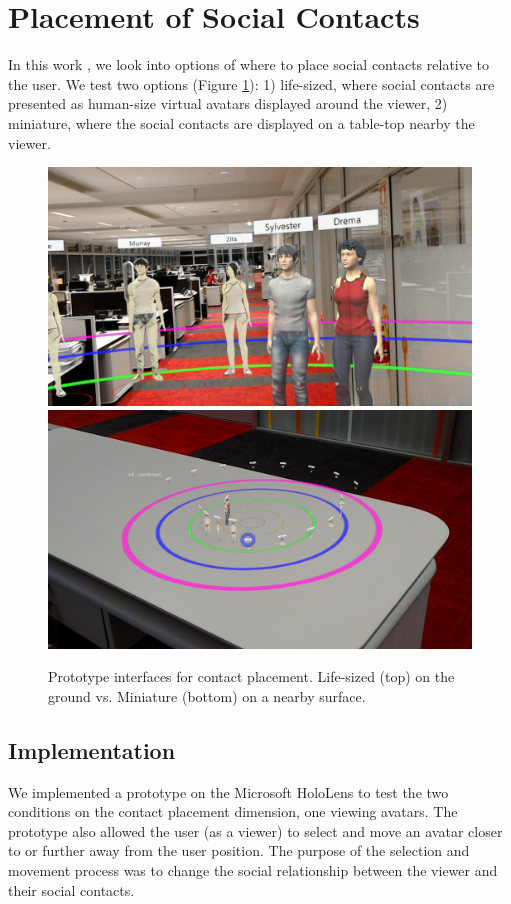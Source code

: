\section{Placement of Social Contacts}
\label{sec:contacts:placing}

In this work \cite{Nassani2017a}, we look into options of where to place social contacts relative to the user. We test two options (Figure \ref{fig:continuum:conditions}): 1) life-sized, where social contacts are presented as human-size virtual avatars displayed around the viewer, 2) miniature, where the social contacts are displayed on a table-top nearby the viewer. 

\begin{figure}[h]
    \centering
    \includegraphics[width=0.6\linewidth]{images/ismar17/20170625_205203_HoloLens.jpg}    \includegraphics[width=0.6\linewidth]{images/ismar17/20170625_205112_HoloLens.jpg}
    \caption{Prototype interfaces for contact placement. Life-sized (top) on the ground vs. Miniature (bottom) on a nearby surface.} 
    \label{fig:continuum:conditions}
\end{figure}

\subsection{Implementation}

We implemented a prototype on the Microsoft HoloLens to test the two conditions on the contact placement dimension, one viewing avatars. The prototype also allowed the user (as a viewer) to select and move an avatar closer to or further away from the user position. The purpose of the selection and movement process was to change the social relationship between the viewer and their social contacts. 

